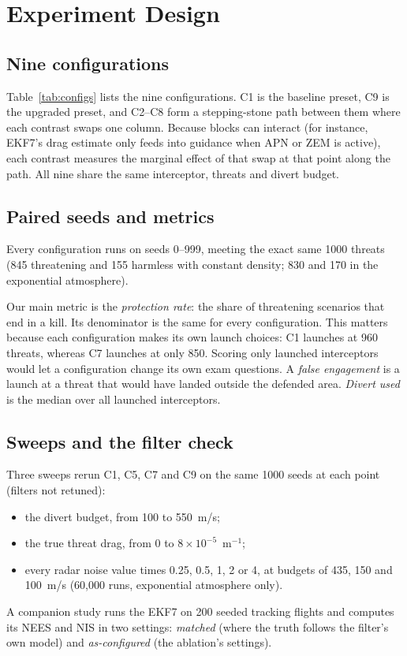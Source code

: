 \documentclass[conference,letterpaper]{IEEEtran}
\begin{document}
\section{Experiment Design}
\label{sec:design}

\subsection{Nine configurations}

Table~\ref{tab:configs} lists the nine configurations.
C1 is the baseline preset, C9 is the upgraded preset, and C2--C8 form a stepping-stone path between them where each contrast swaps one column.
Because blocks can interact (for instance, EKF7's drag estimate only feeds into guidance when APN or ZEM is active), each contrast measures the marginal effect of that swap at that point along the path.
All nine share the same interceptor, threats and divert budget.

\subsection{Paired seeds and metrics}

Every configuration runs on seeds 0--999, meeting the exact same 1000 threats (845 threatening and 155 harmless with constant density; 830 and 170 in the exponential atmosphere).

Our main metric is the \emph{protection rate}: the share of threatening scenarios that end in a kill.
Its denominator is the same for every configuration.
This matters because each configuration makes its own launch choices: C1 launches at 960 threats, whereas C7 launches at only 850.
Scoring only launched interceptors would let a configuration change its own exam questions.
A \emph{false engagement} is a launch at a threat that would have landed outside the defended area.
\emph{Divert used} is the median over all launched interceptors.

\subsection{Sweeps and the filter check}

Three sweeps rerun C1, C5, C7 and C9 on the same 1000 seeds at each point (filters not retuned):
\begin{itemize}
\item the divert budget, from 100 to 550~m/s;
\item the true threat drag, from 0 to $8\times10^{-5}$~m$^{-1}$;
\item every radar noise value times 0.25, 0.5, 1, 2 or 4, at budgets of 435, 150 and 100~m/s (60{,}000 runs, exponential atmosphere only).
\end{itemize}
A companion study runs the EKF7 on 200 seeded tracking flights and computes its NEES and NIS in two settings: \emph{matched} (where the truth follows the filter's own model) and \emph{as-configured} (the ablation's settings).
\end{document}
